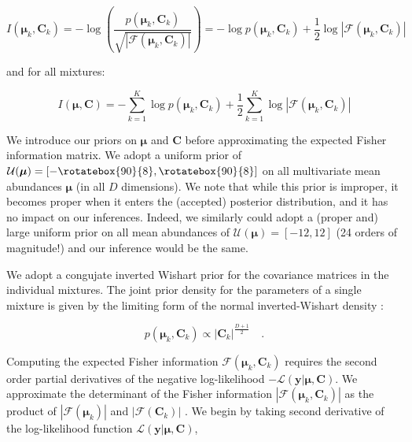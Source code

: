 \documentclass{aastex61}
\newcommand{\vect}[1]{\boldsymbol{\mathbf{#1}}}
\def\infinity{\rotatebox{90}{8}}
\def\veccov{\vect{C}}
\def\vecmean{\vect{\mu}}
\def\datum{y}
\def\data{\vect{\datum}}
\def\likelihood{\mathcal{L}}
\begin{document}
\begin{equation}
  I(\vecmean_k,\veccov_k) = -\log{\left(\frac{p(\vecmean_k,\veccov_k)}{\sqrt{|\mathcal{F}\left(\vecmean_k,\veccov_k\right)|}}\right)}
                          = -\log{p(\vecmean_k,\veccov_k)} + \frac{1}{2}\log{|\mathcal{F}\left(\vecmean_k,\veccov_k\right)|}
\end{equation}

\noindent{}and for all mixtures:

\begin{equation}
  I(\vecmean,\veccov) = -\sum_{k=1}^{K}\log{p(\vecmean_k,\veccov_k)} + \frac{1}{2}\sum_{k=1}^{K}\log{|\mathcal{F}\left(\vecmean_k,\veccov_k\right)|}
  \label{eq:10}
\end{equation}

We introduce our priors on $\vecmean$ and $\veccov$ before approximating the
expected Fisher information matrix.
We adopt a uniform prior of $\mathcal{U}(\vecmean) = [-\infinity, \infinity]$ 
on all multivariate mean abundances $\vecmean$ (in all $D$ dimensions).
We note that while this prior is improper, it becomes proper when it enters
the (accepted) posterior distribution, and it has no impact on our inferences.
Indeed, we similarly could adopt a (proper and) large uniform prior on all 
mean abundances of $\mathcal{U}(\vecmean) = [-12, 12]$ (24 orders of magnitude!)
and our inference would be the same.

We adopt a congujate inverted Wishart prior for the covariance matrices in the
individual mixtures. 
The joint prior density for the parameters of a single
mixture is given by the limiting form of the normal inverted-Wishart
density \citep[e.g., Section 5.2.3 of ][]{Schafer_1997}:

\begin{equation}
    p(\vecmean_k,\veccov_k) \propto |\veccov_k|^{\frac{D + 1}{2}} \quad .
    \label{eq:prior-mean-cov}
\end{equation}


Computing the expected Fisher information $\mathcal{F}(\vecmean_k,\veccov_k)$ 
requires the second order partial derivatives of the negative log-likelihood 
$-\likelihood(\data|\vecmean,\veccov)$.
We approximate the determinant of the Fisher information 
$|\mathcal{F}(\vecmean_k, \veccov_k)|$ as the product of 
$|\mathcal{F}\left(\vecmean_k\right)|$ and $|\mathcal{F}\left(\veccov_k\right)|$ 
\citep{Oliver_1996,Roberts_1998}. 
We begin by taking second derivative of the log-likelihood function
$\likelihood\left(\data|\vecmean,\veccov\right)$,
\end{document}
